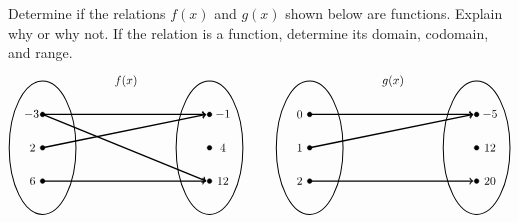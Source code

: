 \documentclass[11pt,letterpaper]{article}
\begin{document}

 Determine if the relations $f(x)$ and $g(x)$ shown below are functions. Explain why or why not. If the relation is a function, determine its domain, codomain, and range. 
	\[
	\begin{tikzpicture}
	\node at (2.5,2) {$f(x)$};
	\draw[line width=0.03cm] (0,0) circle (1 and 2);
	\draw[line width=0.03cm] (5,0) circle (1 and 2);
	
	\draw[fill=black] (0,1) circle (0.07);
	\draw[fill=black] (0,0) circle (0.07);
	\draw[fill=black] (0,-1) circle (0.07);
	
	\draw[fill=black] (5,1) circle (0.07);
	\draw[fill=black] (5,0) circle (0.07);
	\draw[fill=black] (5,-1) circle (0.07);
	
	\draw[line width=0.04cm,->] (0,1) -- (4.9,1);
	\draw[line width=0.04cm,->] (0,1) -- (4.9,-1);
	\draw[line width=0.04cm,->] (0,0) -- (4.9,1);
	\draw[line width=0.04cm,->] (0,-1) -- (4.9,-1);
	
	\node at (-0.3,1) {$\!-3$};
	\node at (-0.3,0) {$2$};
	\node at (-0.3,-1) {$6$};
	
	\node at (5.4,1) {$-1$};
	\node at (5.4,0) {$4$};
	\node at (5.4,-1) {$12$};
	
	\tikzset{shift={(8,0)}}
	\node at (2.5,2) {$g(x)$};
	\draw[line width=0.03cm] (0,0) circle (1 and 2);
	\draw[line width=0.03cm] (5,0) circle (1 and 2);
	
	\draw[fill=black] (0,1) circle (0.07);
	\draw[fill=black] (0,0) circle (0.07);
	\draw[fill=black] (0,-1) circle (0.07);
	
	\draw[fill=black] (5,1) circle (0.07);
	\draw[fill=black] (5,0) circle (0.07);
	\draw[fill=black] (5,-1) circle (0.07);
	
	\draw[line width=0.04cm,->] (0,1) -- (4.9,1);
	\draw[line width=0.04cm,->] (0,0) -- (4.9,1);
	\draw[line width=0.04cm,->] (0,-1) -- (4.9,-1);
	
	\node at (-0.3,1) {$0$};
	\node at (-0.3,0) {$1$};
	\node at (-0.3,-1) {$2$};
	
	\node at (5.4,1) {$-5$};
	\node at (5.4,0) {$12$};
	\node at (5.4,-1) {$20$};
	\end{tikzpicture}
	\]
\end{document}
